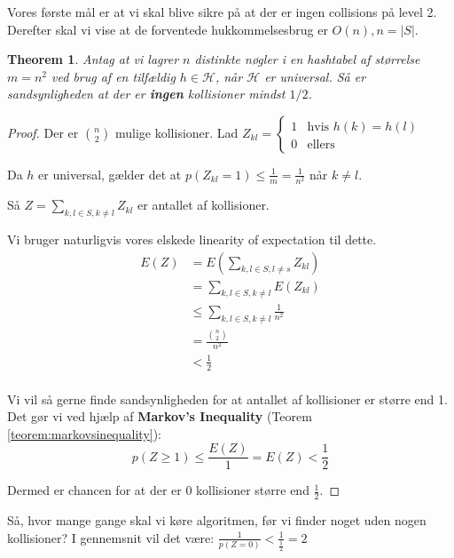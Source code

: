 \documentclass[11pt]{article}
\newtheorem{theorem}{Theorem}
\theoremstyle{definition}
\theoremstyle{remark}
\begin{document}
Vores første mål er at vi skal blive sikre på at der er ingen collisions på level 2. Derefter skal vi vise at de forventede hukkommelsesbrug er $O(n), n = |S|$.

\begin{theorem}
  Antag at vi lagrer $n$ distinkte nøgler i en hashtabel af størrelse $m = n^{2}$ ved brug af en tilfældig $h \in \mathcal{H}$, når $\mathcal{H}$ er universal. Så er sandsynligheden at der er \textbf{ingen} kollisioner mindst $1/2$.
\end{theorem}

\begin{proof}

  Der er $\binom{n}{2}$ mulige kollisioner.
  Lad $Z_{kl} = \begin{cases} 1 &\text{hvis } h(k) = h(l) \\ 0 &\text{ellers} \end{cases}$

  Da $h$ er universal, gælder det at $p(Z_{kl} = 1) \leq \frac{1}{m} = \frac{1}{n^{2}}$ når $k \neq l$.

  Så $Z = \sum_{k, l \in S, k \neq l}^{}Z_{kl}$ er antallet af kollisioner.

  Vi bruger naturligvis vores elskede linearity of expectation til dette.
  \begin{equation}
    \begin{split}
      E(Z) &= E(\sum_{k, l \in S, l \neq s}^{}Z_{kl})\\
           &= \sum_{k,l \in S, k \neq l}^{} E(Z_{kl}) \\
           &\leq \sum_{k, l \in S, k \neq l}^{} \frac{1}{n^{2}}\\
           &= \frac{\binom{n}{2}}{n^{2}}\\
      &< \frac{1}{2}\\
    \end{split}
  \end{equation}

  Vi vil så gerne finde sandsynligheden for at antallet af kollisioner er større end 1. Det gør vi ved hjælp af \textbf{Markov's Inequality} (Teorem \ref{teorem:markovsinequality}):
  \[ p(Z \geq 1) \leq \frac{E(Z)}{1} = E(Z) < \frac{1}{2} \]

  Dermed er chancen for at der er 0 kollisioner større end $\frac{1}{2}$.
\end{proof}

Så, hvor mange gange skal vi køre algoritmen, før vi finder noget uden nogen kollisioner? I gennemsnit vil det være: $\frac{1}{p(Z=0)} < \frac{1}{\frac{1}{2}} = 2$
\end{document}
